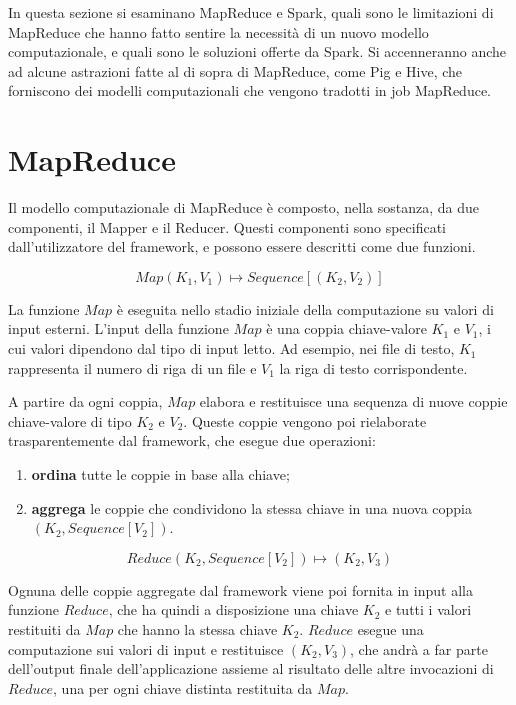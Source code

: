 \documentclass[italian,a4paper, twoside, 12pt]{report}
\providecommand{\tightlist}{%
  \setlength{\itemsep}{0pt}\setlength{\parskip}{0pt}}
\begin{document}
In questa sezione si esaminano MapReduce e Spark, quali sono le
limitazioni di MapReduce che hanno fatto sentire la necessità di un
nuovo modello computazionale, e quali sono le soluzioni offerte da
Spark. Si accenneranno anche ad alcune astrazioni fatte al di sopra di
MapReduce, come Pig e Hive, che forniscono dei modelli computazionali
che vengono tradotti in job MapReduce.

\section{MapReduce}\label{mapreduce}

Il modello computazionale di MapReduce è composto, nella sostanza, da
due componenti, il Mapper e il Reducer. Questi componenti sono
specificati dall'utilizzatore del framework, e possono essere descritti
come due funzioni.

\[Map(K_1, V_1) \mapsto Sequence[(K_2, V_2)]\]

La funzione \(Map\) è eseguita nello stadio iniziale della computazione
su valori di input esterni. L'input della funzione \(Map\) è una coppia
chiave-valore \(K_1\) e \(V_1\), i cui valori dipendono dal tipo di
input letto. Ad esempio, nei file di testo, \(K_1\) rappresenta il
numero di riga di un file e \(V_1\) la riga di testo corrispondente.

A partire da ogni coppia, \(Map\) elabora e restituisce una sequenza di
nuove coppie chiave-valore di tipo \(K_2\) e \(V_2\). Queste coppie
vengono poi rielaborate trasparentemente dal framework, che esegue due
operazioni:

\begin{enumerate}
\tightlist
\item
  \textbf{ordina} tutte le coppie in base alla chiave;
\item
  \textbf{aggrega} le coppie che condividono la stessa chiave in una
  nuova coppia \((K_2, Sequence[V_2])\).
\end{enumerate}

\[Reduce(K_2, Sequence[V_2]) \mapsto (K_2, V_3)\]

Ognuna delle coppie aggregate dal framework viene poi fornita in input
alla funzione \(Reduce\), che ha quindi a disposizione una chiave
\(K_2\) e tutti i valori restituiti da \(Map\) che hanno la stessa
chiave \(K_2\). \(Reduce\) esegue una computazione sui valori di input e
restituisce \((K_2, V_3)\), che andrà a far parte dell'output finale
dell'applicazione assieme al risultato delle altre invocazioni di
\(Reduce\), una per ogni chiave distinta restituita da \(Map\).
\end{document}
